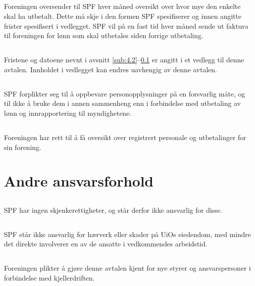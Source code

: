 \documentclass[12pt]{article}
\begin{document}
\subsection{}
\label{sub:4.3}
Foreningen oversender til SPF hver måned oversikt over hvor mye den enkelte skal ha 
utbetalt.
Dette må skje i den formen SPF spesifiserer
og innen angitte frister spesifisert i vedlegget.
SPF vil på en fast tid hver måned sende ut faktura
til foreningen for lønn som skal utbetales siden forrige utbetaling.

\subsection{}
\label{sub:4.5}
Fristene og datoene nevnt i avsnitt
\ref{sub:4.2}--\ref{sub:4.3} er angitt
i et vedlegg til denne avtalen.
Innholdet i vedlegget kan endres
uavhengig av denne avtalen.
\subsection{}
\label{sub:4.6}
SPF forplikter seg til å oppbevare
personopplysninger på en forsvarlig måte,
og til ikke å bruke dem i annen
sammenheng enn i forbindelse med utbetaling
av lønn og innrapportering til
myndighetene.
\subsection{}
\label{sub:4.7}
Foreningen har rett til å få oversikt
over registrert personale
og utbetalinger for sin forening.
\section{Andre ansvarsforhold}
\label{sec:5}
\subsection{}
\label{sub:5.1}
SPF har ingen skjenkerettigheter,
og står derfor ikke ansvarlig for disse.
\subsection{}
\label{sub:5.2}
SPF står ikke ansvarlig for hærverk
eller skader på UiOs eiedendom,
med mindre det direkte involverer
en av de ansatte i vedkommendes arbeidstid.
\subsection{}
\label{sub:5.3}
Foreningen plikter å gjøre denne avtalen 
kjent for nye styrer og ansvarspersoner i 
forbindelse med kjellerdriften.
\end{document}

